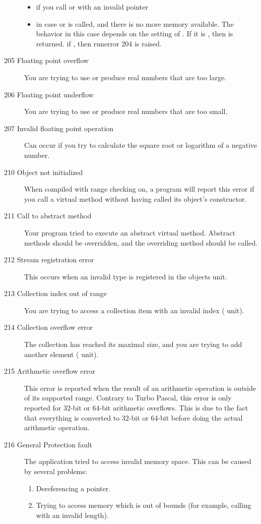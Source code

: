\begin{description}
\begin{itemize}
\item if you call  or  with an invalid pointer
\item in case  or  is called, and there is no more memory
available. The behavior in this case depends on the setting of
. If it is , then  is returned.
if , then runerror 204 is raised.
\end{itemize}
\item [205  Floating point overflow]
You are trying to use or produce real numbers that are too large.
\item [206  Floating point underflow]
You are trying to use or produce real numbers that are too small.
\item [207  Invalid floating point operation]
Can occur if you try to calculate the square root or logarithm of a negative
number.
\item [210  Object not initialized]
When compiled with range checking on, a program will report this error if
you call a virtual method without having called its object's constructor.
\item [211  Call to abstract method]
Your program tried to execute an abstract virtual method. Abstract methods
should be overridden, and the overriding method should be called.
\item [212  Stream registration error]
This occurs when an invalid type is registered in the objects unit.
\item [213  Collection index out of range]
You are trying to access a collection item with an invalid index
( unit).
\item [214  Collection overflow error]
The collection has reached its maximal size, and you are trying to add
another element ( unit).
\item[215 Arithmetic overflow error]
This error is reported when the result of an arithmetic operation
is outside of its supported range. Contrary to Turbo Pascal, this error
is only reported for 32-bit or 64-bit arithmetic overflows. This is due
to the fact that everything is converted to 32-bit or 64-bit before
doing the actual arithmetic operation.
\item [216  General Protection fault]
The application tried to access invalid memory space. This can
be caused by several problems:
\begin{enumerate}
 \item Dereferencing a  pointer.
 \item Trying to access memory which is out of bounds
       (for example, calling  with an invalid length).
\end{enumerate}


\end{description}
